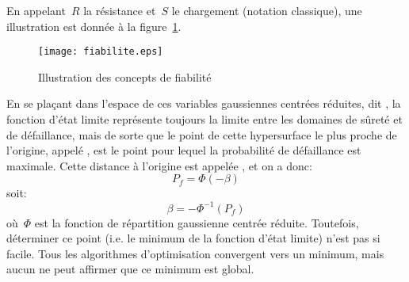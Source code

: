 \medskip
En appelant~$R$ la résistance et~$S$ le chargement (notation classique), une illustration est donnée à la figure~\ref{Fig-StoFiab}.
\begin{figure}[htb]
\centering
\texttt{[image: fiabilite.eps]}
\caption{Illustration des concepts de fiabilité}\label{Fig-StoFiab}
\end{figure}

\medskip
En se plaçant dans l'espace de ces variables gaussiennes centrées réduites, dit , la fonction d'état limite représente toujours la limite entre les domaines de sûreté et de défaillance, mais de sorte que le point de cette hypersurface le plus proche de l'origine, appelé , est le point pour lequel la probabilité de défaillance est maximale.
Cette distance à l'origine est appelée , et on a donc:
\begin{equation}\label{Eq-StoPf}
P_f = \Phi(-\beta)
\end{equation}
soit:
\begin{equation}
\beta = -\Phi^{-1}(P_f)
\end{equation}
où~$\Phi$ est la fonction de répartition gaussienne centrée réduite.
Toutefois, déterminer ce point (i.e. le minimum de la fonction d'état limite) n'est pas si facile. Tous les algorithmes d'optimisation convergent vers un minimum, mais aucun ne peut affirmer que ce minimum est global.

